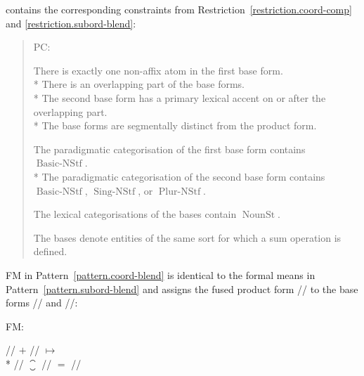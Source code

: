\documentclass[output=paper
  ,nobabel
  ,draftmode
  ,colorlinks, citecolor=brown
]{langscibook}
\begin{document}
contains the corresponding constraints from Restriction \ref{restriction.coord-comp} and \ref{restriction.subord-blend}: \begin{quotation}
\begin{restriction}
\label{restriction.coord-blend}\vspace{-1.25\baselineskip}
\begin{labeledlist}{PC:}
\item[FC:] \raggedright There is exactly one non-affix atom in the first base
form.\\*{}
There is an overlapping part of the base forms.\\*{}
The second base form has a primary lexical accent on or after the overlapping
part.\\*{}
The base forms are segmentally distinct from the product form.
\item[PC:] \raggedright The paradigmatic categorisation of the first base form contains $\operatorname{Basic-NStf}$.\\*{}
The paradigmatic categorisation of the second base form contains $\operatorname{Basic-NStf}$, $\operatorname{Sing-NStf}$, or $\operatorname{Plur-NStf}$.
\item[LC:] \raggedright The lexical categorisations of the bases contain $\operatorname{NounSt}$.
\item[SC:] \raggedright The bases denote entities of the same sort for which a sum operation is
defined.
\end{labeledlist}
\end{restriction}
\end{quotation}

FM in Pattern \ref{pattern.coord-blend} is identical
to the formal means in Pattern \ref{pattern.subord-blend} and assigns the fused product form // to the base forms
// and //: \begin{exe}
\ex \raggedright
\begin{labeledlist}{FM:}
\item[FM:] \raggedright // $+$ //
$↦$\\*{}
// $⁐$ //
$=$ //
\end{labeledlist}
\end{exe}
\end{document}
